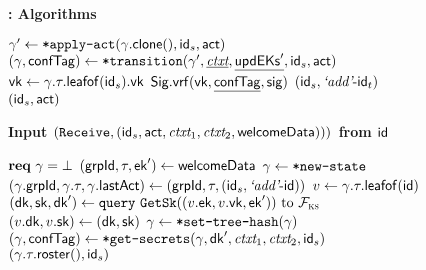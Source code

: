 \begin{figure*}[!p]
\begin{anybox}{\sffamily\bfseries \saik : Algorithms}
\begin{minipage}[t]{0.5\linewidth}
        \textnormal{}
        \begin{algorithmic}
          \State \KwTry{} $\gamma' \gets {\ensuremath{\textnormal{\tt*apply-act}}}(\gamma.{\mathsf{clone}}(), {\mathsf{id}}_s, \mathsf{act})$
          \State \KwTry{} $(\gamma, {\mathsf{confTag}}) \gets {\ensuremath{\textnormal{\tt*transition}}}(\gamma', \underline{{\normalfont\textit{ctxt}}}, \underline{{\mathsf{updEKs}}'}, {\mathsf{id}}_s, \mathsf{act})$
          \State ${\mathsf{vk}} \gets \gamma.\tau.{\mathsf{leafof}}({\mathsf{id}}_s).{\mathsf{vk}}$
          \State \KwReq{} ${\mathsf{Sig}}.{\mathsf{vrf}}({\mathsf{vk}}, \underline{{\mathsf{confTag}}}, {\mathsf{sig}})$
            \Return $({\mathsf{id}}_s, {\text{\normalfont \it`add'}}\textrm{-}{\ensuremath{\mathsf{id}}}_t)$
          \Else\
            \Return $({\mathsf{id}}_s, \mathsf{act})$
          \EndIf
        \end{algorithmic}

        \medskip
        \textbf{Input $({\normalfont\texttt{Receive}}, ({\mathsf{id}}_s, \mathsf{act}, {\normalfont\textit{ctxt}}_1, {\normalfont\textit{ctxt}}_2, \textnormal{\textsf{welcomeData}})))$ from ${\mathsf{id}}$}

        \textnormal{}
        \begin{algorithmic}
          \State $\textbf{req}\ \gamma = \bot$
          \State \KwParse{} $({\mathsf{grpId}}, \tau, {\mathsf{ek}}') \gets \textnormal{\textsf{welcomeData}}$
          \State $\gamma \gets {\ensuremath{\textnormal{\tt*new-state}}}$
          \State $(\gamma.{\mathsf{grpId}}, \gamma.\tau, \gamma.{\mathsf{lastAct}}) \gets ({\mathsf{grpId}}, \tau, ({\mathsf{id}}_s, {\text{\normalfont \it`add'}}\textrm{-}{\ensuremath{\mathsf{id}}}))$
          \State $v \gets \gamma.\tau.{\mathsf{leafof}}({\mathsf{id}})$
          \State \KwTry{} $({\mathsf{dk}}, {\mathsf{sk}}, {\mathsf{dk}}') \gets {\normalfont\texttt{query}}\ {\normalfont\texttt{GetSk}}((v.{\mathsf{ek}}, v.{\mathsf{vk}}, {\mathsf{ek}}')) \textnormal{ to } \mathcal{F}_{\normalfont\textsc{ks}}$
          \State $(v.{\mathsf{dk}}, v.{\mathsf{sk}}) \gets ({\mathsf{dk}}, {\mathsf{sk}})$
          \State $\gamma \gets {{\ensuremath{\textnormal{\tt*set-tree-hash}}}}(\gamma)$
          \State \KwTry{} $(\gamma, {\mathsf{confTag}}) \gets {\ensuremath{\textnormal{\tt*get-secrets}}}(\gamma, {\mathsf{dk}}', {\normalfont\textit{ctxt}}_1, {\normalfont\textit{ctxt}}_2, {\mathsf{id}}_s)$
					\State \Return $(\gamma.\tau.{\mathsf{roster}}(), {\mathsf{id}}_s)$
        \end{algorithmic}
      \end{minipage}
  \end{anybox}


\end{figure*}
